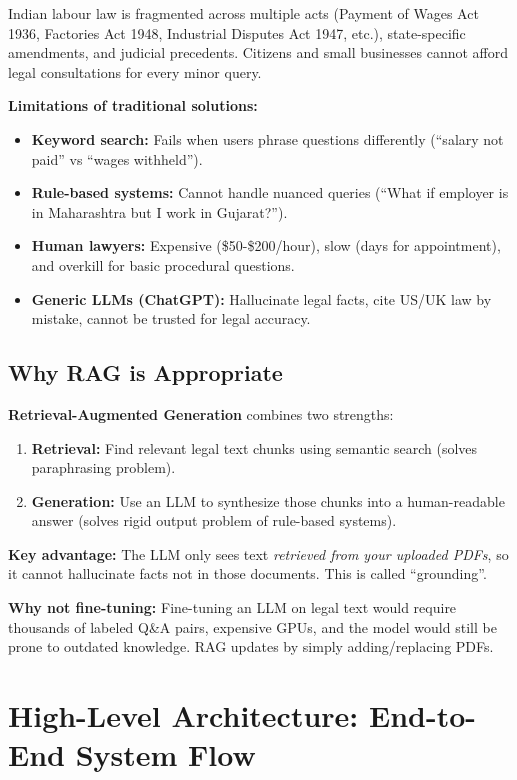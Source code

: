 \documentclass[11pt,a4paper]{article}
\begin{document}
Indian labour law is fragmented across multiple acts (Payment of Wages Act 1936, Factories Act 1948, Industrial Disputes Act 1947, etc.), state-specific amendments, and judicial precedents. Citizens and small businesses cannot afford legal consultations for every minor query.

\textbf{Limitations of traditional solutions:}
\begin{itemize}
\item \textbf{Keyword search:} Fails when users phrase questions differently (``salary not paid'' vs ``wages withheld'').
\item \textbf{Rule-based systems:} Cannot handle nuanced queries (``What if employer is in Maharashtra but I work in Gujarat?'').
\item \textbf{Human lawyers:} Expensive (\$50-\$200/hour), slow (days for appointment), and overkill for basic procedural questions.
\item \textbf{Generic LLMs (ChatGPT):} Hallucinate legal facts, cite US/UK law by mistake, cannot be trusted for legal accuracy.
\end{itemize}

\subsection{Why RAG is Appropriate}

\textbf{Retrieval-Augmented Generation} combines two strengths:
\begin{enumerate}
\item \textbf{Retrieval:} Find relevant legal text chunks using semantic search (solves paraphrasing problem).
\item \textbf{Generation:} Use an LLM to synthesize those chunks into a human-readable answer (solves rigid output problem of rule-based systems).
\end{enumerate}

\textbf{Key advantage:} The LLM only sees text \textit{retrieved from your uploaded PDFs}, so it cannot hallucinate facts not in those documents. This is called ``grounding''.

\textbf{Why not fine-tuning:} Fine-tuning an LLM on legal text would require thousands of labeled Q\&A pairs, expensive GPUs, and the model would still be prone to outdated knowledge. RAG updates by simply adding/replacing PDFs.

\section{High-Level Architecture: End-to-End System Flow}
\end{document}
